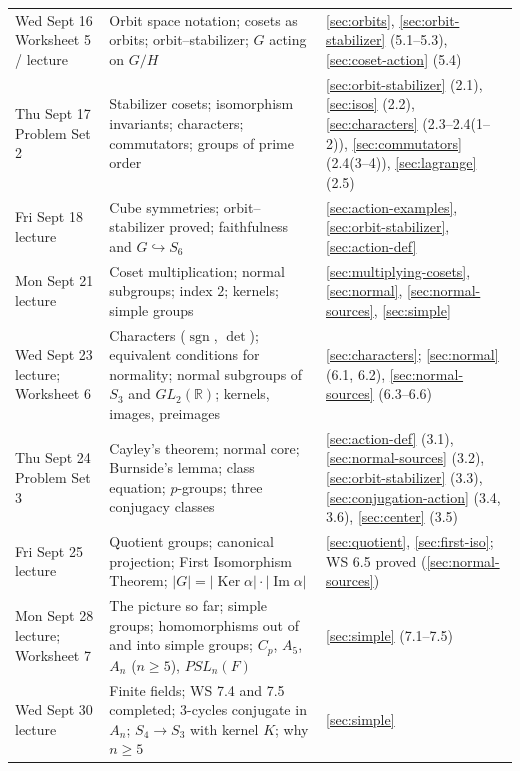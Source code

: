 \documentclass[11pt]{report}
\newcommand{\sgn}{\operatorname{sgn}}
\begin{document}
{\begin{longtable}{p{3.4cm}p{4.2cm}p{6.4cm}}
Wed Sept 16 \newline Worksheet 5 / lecture & Orbit space notation; cosets as orbits; orbit--stabilizer; $G$ acting on $G/H$ & \ref{sec:orbits}, \ref{sec:orbit-stabilizer} (5.1--5.3), \ref{sec:coset-action} (5.4) \\
Thu Sept 17 \newline Problem Set 2 & Stabilizer cosets; isomorphism invariants; characters; commutators; groups of prime order & \ref{sec:orbit-stabilizer} (2.1), \ref{sec:isos} (2.2), \ref{sec:characters} (2.3--2.4(1--2)), \ref{sec:commutators} (2.4(3--4)), \ref{sec:lagrange} (2.5) \\
Fri Sept 18 \newline lecture & Cube symmetries; orbit--stabilizer proved; faithfulness and $G \hookrightarrow S_6$ & \ref{sec:action-examples}, \ref{sec:orbit-stabilizer}, \ref{sec:action-def} \\
Mon Sept 21 \newline lecture & Coset multiplication; normal subgroups; index $2$; kernels; simple groups & \ref{sec:multiplying-cosets}, \ref{sec:normal}, \ref{sec:normal-sources}, \ref{sec:simple} \\
Wed Sept 23 \newline lecture; Worksheet 6 & Characters ($\sgn$, $\det$); equivalent conditions for normality; normal subgroups of $S_3$ and $GL_2(\mathbb{R})$; kernels, images, preimages & \ref{sec:characters}; \ref{sec:normal} (6.1, 6.2), \ref{sec:normal-sources} (6.3--6.6) \\
Thu Sept 24 \newline Problem Set 3 & Cayley's theorem; normal core; Burnside's lemma; class equation; $p$-groups; three conjugacy classes & \ref{sec:action-def} (3.1), \ref{sec:normal-sources} (3.2), \ref{sec:orbit-stabilizer} (3.3), \ref{sec:conjugation-action} (3.4, 3.6), \ref{sec:center} (3.5) \\
Fri Sept 25 \newline lecture & Quotient groups; canonical projection; First Isomorphism Theorem; $|G| = |\operatorname{Ker}\alpha| \cdot |\operatorname{Im}\alpha|$ & \ref{sec:quotient}, \ref{sec:first-iso}; WS 6.5 proved (\ref{sec:normal-sources}) \\
Mon Sept 28 \newline lecture; Worksheet 7 & The picture so far; simple groups; homomorphisms out of and into simple groups; $C_p$, $A_5$, $A_n$ ($n \geq 5$), $PSL_n(F)$ & \ref{sec:simple} (7.1--7.5) \\
Wed Sept 30 \newline lecture & Finite fields; WS 7.4 and 7.5 completed; $3$-cycles conjugate in $A_n$; $S_4 \to S_3$ with kernel $K$; why $n \geq 5$ & \ref{sec:simple} \\

\end{longtable}}
\end{document}
